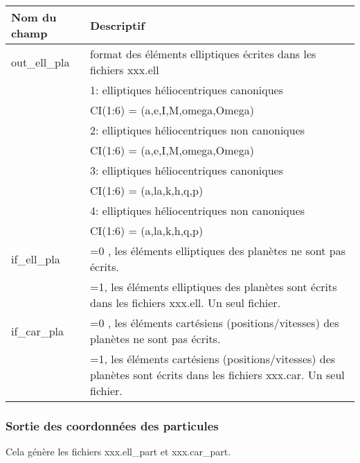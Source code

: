 \documentclass[11pt]{article}
\begin{document}
\begin{tabularx}{\textwidth}{|l|X|}
\hline
Nom du champ& Descriptif \\ \hline \hline
 out\_ell\_pla & format des \'el\'ements elliptiques \'ecrites dans les fichiers xxx.ell \\
&1:  elliptiques h\'eliocentriques canoniques\\
&	     CI(1:6) = (a,e,I,M,omega,Omega)\\
&2:  elliptiques h\'eliocentriques non canoniques\\
&	     CI(1:6) = (a,e,I,M,omega,Omega)\\
&3:  elliptiques h\'eliocentriques canoniques\\
&	     CI(1:6) = (a,la,k,h,q,p)\\
&4:  elliptiques h\'eliocentriques non canoniques\\
&	     CI(1:6) = (a,la,k,h,q,p)\\ \hline
 if\_ell\_pla  & =0 , les \'el\'ements elliptiques des plan\`etes ne sont pas \'ecrits.\\
&=1, les \'el\'ements elliptiques  des plan\`etes sont \'ecrits dans les fichiers xxx.ell. Un seul fichier.\\ \hline
 
 if\_car\_pla  &  =0 , les \'el\'ements cart\'esiens (positions/vitesses)  des plan\`etes  ne sont pas \'ecrits.\\
&=1, les \'el\'ements cart\'esiens (positions/vitesses)  des plan\`etes  sont \'ecrits dans les fichiers xxx.car. Un seul fichier.\\ \hline 
 \end{tabularx}

\vspace{0.5cm}
\subsubsection*{Sortie des coordonn\'ees des particules}
Cela g\'en\`ere les fichiers xxx.ell\_part et xxx.car\_part.
\end{document}
